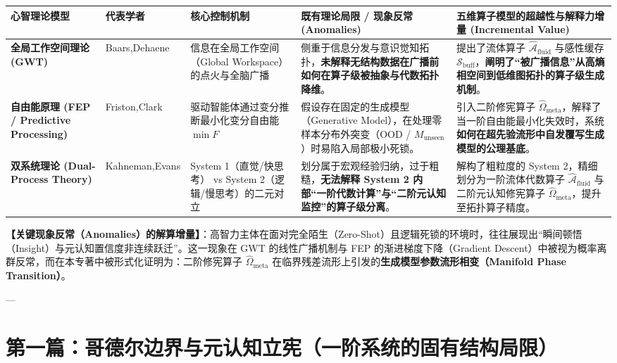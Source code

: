 \documentclass[11pt,a4paper,oneside]{ctexart}
\begin{document}
\begin{table}[htbp]
\centering
\small
\begin{tabular}{p{2.2cm}p{2.5cm}p{2.5cm}p{2.2cm}p{5.5cm}}
\toprule
心智理论模型 & 代表学者 & 核心控制机制 & 既有理论局限 / 现象反常 (Anomalies) & \textbf{五维算子模型的超越性与解释力增量 (Incremental Value)} \\
\midrule
\textbf{全局工作空间理论 (GWT)} & Baars,\newline Dehaene & 信息在全局工作空间（Global Workspace）的点火与全脑广播 & 侧重于信息分发与意识觉知拓扑，\textbf{未解释无结构数据在广播前如何在算子级被抽象与代数拓扑降维}。 & 提出了流体算子 $\hat{\mathcal{A}}_{\text{fluid}}$ 与感性缓存 $\mathcal{S}_{\text{buff}}$，\textbf{阐明了“被广播信息”从高熵相空间到低维图拓扑的算子级生成机制}。 \\
\textbf{自由能原理 (FEP / Predictive Processing)} & Friston,\newline Clark & 驱动智能体通过变分推断最小化变分自由能 $\min F$ & 假设存在固定的生成模型（Generative Model），在处理\textit{}零样本分布外突变（OOD / $M_{\text{unseen}}$）时易陷入局部极小死锁\textit{}。 & 引入二阶修宪算子 $\hat{\Omega}_{\text{meta}}$，解释了当一阶自由能最小化失效时，系统\textbf{如何在超先验流形中自发覆写生成模型的公理基底}。 \\
\textbf{双系统理论 (Dual-Process Theory)} & Kahneman,\newline Evans & System 1（直觉/快思考） vs System 2（逻辑/慢思考）的二元对立 & 划分属于宏观经验归纳，过于粗糙，\textbf{无法解释 System 2 内部“一阶代数计算”与“二阶元认知监控”的算子级分离}。 & 解构了粗粒度的 System 2，精细划分为\textit{}一阶流体代数算子 $\hat{\mathcal{A}}_{\text{fluid}}$ 与二阶元认知修宪算子 $\hat{\Omega}_{\text{meta}}$\textit{}，提升至拓扑算子精度。 \\
\bottomrule
\end{tabular}
\end{table}

\begin{notebox}
\textbf{【关键现象反常（Anomalies）的解算增量】}：高智力主体在面对完全陌生（Zero-Shot）且逻辑死锁的环境时，往往展现出“瞬间顿悟（Insight）与元认知置信度非连续跃迁”。这一现象在 GWT 的线性广播机制与 FEP 的渐进梯度下降（Gradient Descent）中被视为概率离群反常，而在本专著中被形式化证明为：二阶修宪算子 $\hat{\Omega}_{\text{meta}}$ 在临界残差流形上引发的\textbf{生成模型参数流形相变（Manifold Phase Transition）}。
\end{notebox}

---


\part{第一篇：哥德尔边界与元认知立宪（一阶系统的固有结构局限）}
\end{document}
